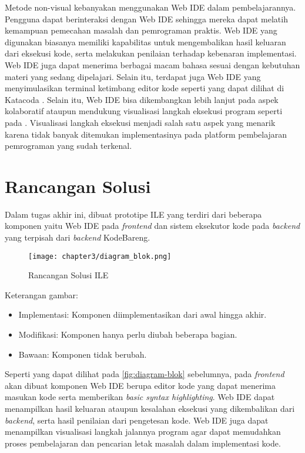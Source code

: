 Metode non-visual kebanyakan menggunakan Web IDE dalam pembelajarannya. Pengguna dapat berinteraksi dengan Web IDE sehingga mereka dapat melatih kemampuan pemecahan masalah dan pemrograman praktis. Web IDE yang digunakan biasanya memiliki kapabilitas untuk mengembalikan hasil keluaran dari eksekusi kode, serta melakukan penilaian terhadap kebenaran implementasi. Web IDE juga dapat menerima berbagai macam bahasa sesuai dengan kebutuhan materi yang sedang dipelajari. Selain itu, terdapat juga Web IDE yang menyimulasikan terminal ketimbang editor kode seperti yang dapat dilihat di Katacoda \parencite{katacoda2021media}. Selain itu, Web IDE bisa dikembangkan lebih lanjut pada aspek kolaboratif \parencite{tran2013interactive} ataupun mendukung visualisasi langkah eksekusi program seperti pada \textcite{guo2013pythontutor}. Visualisasi langkah eksekusi menjadi salah satu aspek yang menarik karena tidak banyak ditemukan implementasinya pada platform pembelajaran pemrograman yang sudah terkenal.

\section{Rancangan Solusi}
Dalam tugas akhir ini, dibuat prototipe ILE yang terdiri dari beberapa komponen yaitu Web IDE pada \textit{frontend} dan sistem eksekutor kode pada \textit{backend} yang terpisah dari \textit{backend} KodeBareng.

\begin{figure}[H]
  \centering
  \texttt{[image: chapter3/diagram\_blok.png]}
  \caption{Rancangan Solusi ILE} \label{fig:diagram-blok}
\end{figure}

Keterangan gambar:
\begin{itemize}
  \setlength\itemsep{-0.2cm}
  \item Implementasi: Komponen diimplementasikan dari awal hingga akhir.
  \item Modifikasi: Komponen hanya perlu diubah beberapa bagian.
  \item Bawaan: Komponen tidak berubah.
\end{itemize}

Seperti yang dapat dilihat pada \autoref{fig:diagram-blok} sebelumnya, pada \textit{frontend} akan dibuat komponen Web IDE berupa editor kode yang dapat menerima masukan kode serta memberikan \textit{basic syntax highlighting}. Web IDE dapat menampilkan hasil keluaran ataupun kesalahan eksekusi yang dikembalikan dari \textit{backend}, serta hasil penilaian dari pengetesan kode. Web IDE juga dapat menampilkan visualisasi langkah jalannya program agar dapat memudahkan proses pembelajaran dan pencarian letak masalah dalam implementasi kode.


